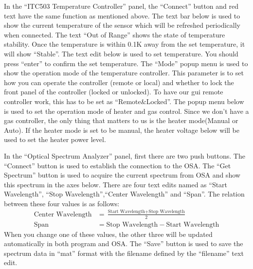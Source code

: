 \documentclass[a4paper,12pt]{article}
\begin{document}
In the ``ITC503 Temperature Controller'' panel, the ``Connect'' button and red text
have the same function as mentioned above. The text bar below is used to show
the current temperature of the sensor which will be refreshed periodically when
connected. The text ``Out of Range'' shows the state of temperature stability.
Once the temperature is within 0.1K away from the set temperature, it will show
``Stable''. The text edit below is used to set temperature. You should press
``enter'' to confirm the set temperature. The ``Mode'' popup menu is used to show
the operation mode of the temperature controller. This parameter is to set how
you can operate the controller (remote or local) and whether to lock the front
panel of the controller (locked or unlocked). To have our gui remote controller
work, this has to be set as ``Remote\&Locked''. The popup menu below is used to
set the operation mode of heater and gas control. Since we don't have a gas
controller, the only thing that matters to us is the heater mode(Manual or
Auto). If the heater mode is set to be manual, the heater voltage below will be
used to set the heater power level. 

In the ``Optical Spectrum Analyzer'' panel, first there are two push buttons.
The ``Connect'' button is used to establish the connection to the OSA. The ``Get
Spectrum'' button is used to acquire the current spectrum from OSA and show this
spectrum in the axes below. There are four text edits named as ``Start
Wavelength'', ``Stop Wavelength'',``Center Wavelength'' and ``Span''. The
relation between these four values is as follows:
\begin{equation}
	\begin{aligned}
		\text{Center Wavelength} &= \frac{\text{Start Wavelength}+\text{Stop Wavelength}}{2}\\
		\text{Span} &=\text{Stop Wavelength}-\text{Start Wavelength}
	\end{aligned}
\end{equation}
When you change one of these values, the other three will be updated
automatically in both program and OSA. The ``Save'' button is used to save the
spectrum data in ``mat'' format with the filename defined by the ``filename''
text edit.
\end{document}
